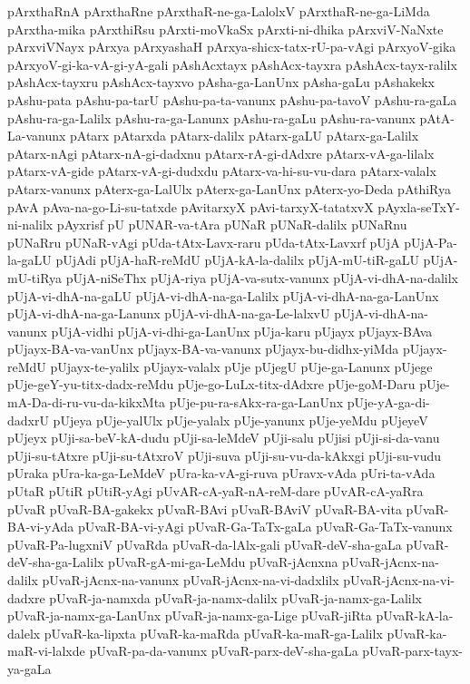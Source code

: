 {pArxthaRnA
pArxthaRne
pArxthaR-ne-ga-LalolxV
pArxthaR-ne-ga-LiMda
pArxtha-mika
pArxthiRsu
pArxti-moVkaSx
pArxti-ni-dhika
pArxviV-NaNxte
pArxviVNayx
pArxya
pArxyashaH
pArxya-shicx-tatx-rU-pa-vAgi
pArxyoV-gika
pArxyoV-gi-ka-vA-gi-yA-gali
pAshAcxtayx
pAshAcx-tayxra
pAshAcx-tayx-ralilx
pAshAcx-tayxru
pAshAcx-tayxvo
pAsha-ga-LanUnx
pAsha-gaLu
pAshakekx
pAshu-pata
pAshu-pa-tarU
pAshu-pa-ta-vanunx
pAshu-pa-tavoV
pAshu-ra-gaLa
pAshu-ra-ga-Lalilx
pAshu-ra-ga-Lanunx
pAshu-ra-gaLu
pAshu-ra-vanunx
pAtA-La-vanunx
pAtarx
pAtarxda
pAtarx-dalilx
pAtarx-gaLU
pAtarx-ga-Lalilx
pAtarx-nAgi
pAtarx-nA-gi-dadxnu
pAtarx-rA-gi-dAdxre
pAtarx-vA-ga-lilalx
pAtarx-vA-gide
pAtarx-vA-gi-dudxdu
pAtarx-va-hi-su-vu-dara
pAtarx-valalx
pAtarx-vanunx
pAterx-ga-LalUlx
pAterx-ga-LanUnx
pAterx-yo-Deda
pAthiRya
pAvA
pAva-na-go-Li-su-tatxde
pAvitarxyX
pAvi-tarxyX-tatatxvX
pAyxla-seTxY-ni-nalilx
pAyxrisf
pU
pUNAR-va-tAra
pUNaR
pUNaR-dalilx
pUNaRnu
pUNaRru
pUNaR-vAgi
pUda-tAtx-Lavx-raru
pUda-tAtx-Lavxrf
pUjA
pUjA-Pa-la-gaLU
pUjAdi
pUjA-haR-reMdU
pUjA-kA-la-dalilx
pUjA-mU-tiR-gaLU
pUjA-mU-tiRya
pUjA-niSeThx
pUjA-riya
pUjA-va-sutx-vanunx
pUjA-vi-dhA-na-dalilx
pUjA-vi-dhA-na-gaLU
pUjA-vi-dhA-na-ga-Lalilx
pUjA-vi-dhA-na-ga-LanUnx
pUjA-vi-dhA-na-ga-Lanunx
pUjA-vi-dhA-na-ga-Le-lalxvU
pUjA-vi-dhA-na-vanunx
pUjA-vidhi
pUjA-vi-dhi-ga-LanUnx
pUja-karu
pUjayx
pUjayx-BAva
pUjayx-BA-va-vanUnx
pUjayx-BA-va-vanunx
pUjayx-bu-didhx-yiMda
pUjayx-reMdU
pUjayx-te-yalilx
pUjayx-valalx
pUje
pUjegU
pUje-ga-Lanunx
pUjege
pUje-geY-yu-titx-dadx-reMdu
pUje-go-LuLx-titx-dAdxre
pUje-goM-Daru
pUje-mA-Da-di-ru-vu-da-kikxMta
pUje-pu-ra-sAkx-ra-ga-LanUnx
pUje-yA-ga-di-dadxrU
pUjeya
pUje-yalUlx
pUje-yalalx
pUje-yanunx
pUje-yeMdu
pUjeyeV
pUjeyx
pUji-sa-beV-kA-dudu
pUji-sa-leMdeV
pUji-salu
pUjisi
pUji-si-da-vanu
pUji-su-tAtxre
pUji-su-tAtxroV
pUji-suva
pUji-su-vu-da-kAkxgi
pUji-su-vudu
pUraka
pUra-ka-ga-LeMdeV
pUra-ka-vA-gi-ruva
pUravx-vAda
pUri-ta-vAda
pUtaR
pUtiR
pUtiR-yAgi
pUvAR-cA-yaR-nA-reM-dare
pUvAR-cA-yaRra
pUvaR
pUvaR-BA-gakekx
pUvaR-BAvi
pUvaR-BAviV
pUvaR-BA-vita
pUvaR-BA-vi-yAda
pUvaR-BA-vi-yAgi
pUvaR-Ga-TaTx-gaLa
pUvaR-Ga-TaTx-vanunx
pUvaR-Pa-lugxniV
pUvaRda
pUvaR-da-lAlx-gali
pUvaR-deV-sha-gaLa
pUvaR-deV-sha-ga-Lalilx
pUvaR-gA-mi-ga-LeMdu
pUvaR-jAcnxna
pUvaR-jAcnx-na-dalilx
pUvaR-jAcnx-na-vanunx
pUvaR-jAcnx-na-vi-dadxlilx
pUvaR-jAcnx-na-vi-dadxre
pUvaR-ja-namxda
pUvaR-ja-namx-dalilx
pUvaR-ja-namx-ga-Lalilx
pUvaR-ja-namx-ga-LanUnx
pUvaR-ja-namx-ga-Lige
pUvaR-jiRta
pUvaR-kA-la-dalelx
pUvaR-ka-lipxta
pUvaR-ka-maRda
pUvaR-ka-maR-ga-Lalilx
pUvaR-ka-maR-vi-lalxde
pUvaR-pa-da-vanunx
pUvaR-parx-deV-sha-gaLa
pUvaR-parx-tayx-ya-gaLa
}
